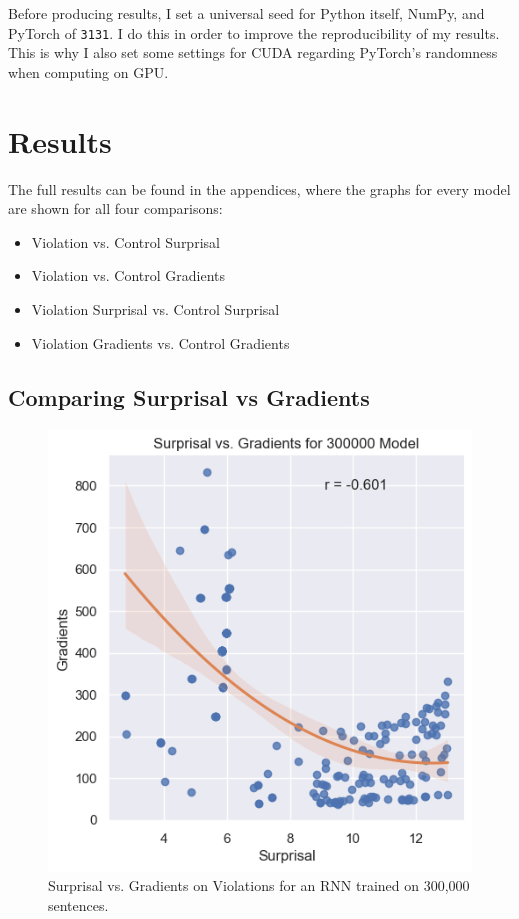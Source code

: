 \documentclass{IEEEtran}
\begin{document}
Before producing results, I set a universal seed for Python itself, NumPy, and PyTorch of \texttt{3131}.
I do this in order to improve the reproducibility of my results.
This is why I also set some settings for CUDA regarding PyTorch's randomness when computing on GPU.

\section{Results}
The full results can be found in the appendices, where the graphs for every model are shown for all four comparisons:
\begin{itemize}
    \item Violation vs. Control Surprisal
    \item Violation vs. Control Gradients
    \item Violation Surprisal vs. Control Surprisal
    \item Violation Gradients vs. Control Gradients
\end{itemize}

\subsection{Comparing Surprisal vs Gradients}
\begin{figure}
    \centering
    \includegraphics[width=.45\textwidth]{violations_surprisal_vs_gradients/300000.png}
    \caption{Surprisal vs. Gradients on Violations for an RNN trained on 300,000 sentences.}
    \label{fig:300000_surprisal_vs_gradients}
\end{figure}
\end{document}
